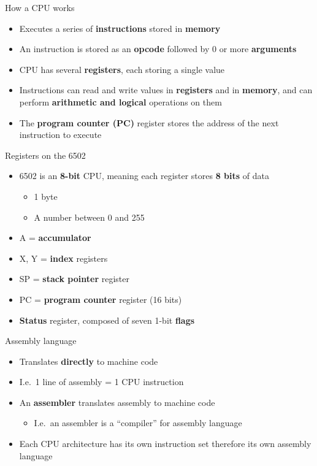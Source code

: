 \begin{frame}{How a CPU works}
	\begin{itemize}
		\pause\item Executes a series of \textbf{instructions} stored in \textbf{memory}
		\pause\item An instruction is stored as an \textbf{opcode} followed by 0 or more \textbf{arguments}
		\pause\item CPU has several \textbf{registers}, each storing a single value
		\pause\item Instructions can read and write values in \textbf{registers} and in \textbf{memory},
			and can perform \textbf{arithmetic and logical} operations on them
		\pause\item The \textbf{program counter (PC)} register stores the address of the next instruction to execute
	\end{itemize}
\end{frame}

\begin{frame}{Registers on the 6502}
	\begin{itemize}
		\pause\item 6502 is an \textbf{8-bit} CPU, meaning each register stores \textbf{8 bits} of data
			\begin{itemize}
				\pause\item 1 byte
				\pause\item A number between 0 and 255
			\end{itemize}
		\pause\item A = \textbf{accumulator}
		\pause\item X, Y = \textbf{index} registers
		\pause\item SP = \textbf{stack pointer} register
		\pause\item PC = \textbf{program counter} register (16 bits)
		\pause\item \textbf{Status} register, composed of seven 1-bit \textbf{flags}
	\end{itemize}
\end{frame}

\begin{frame}{Assembly language}
	\begin{itemize}
		\pause\item Translates \textbf{directly} to machine code
		\pause\item I.e.\ 1 line of assembly = 1 CPU instruction
		\pause\item An \textbf{assembler} translates assembly to machine code
			\begin{itemize}
				\pause\item I.e.\ an assembler is a ``compiler'' for assembly language
			\end{itemize}
		\pause\item Each CPU architecture has its own instruction set therefore
			its own assembly language
	\end{itemize}
\end{frame}

